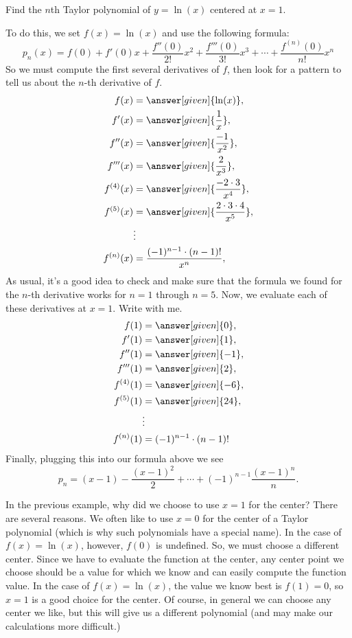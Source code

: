 \documentclass{ximera}
\begin{document}
\begin{example}
Find the $n$th Taylor polynomial of $y=\ln(x)$ centered at $x=1$.
\begin{explanation}
  To do this, we set $f(x) =\ln(x)$ and use the following formula:
    \[
    p_n(x) = f(0) + f'(0)x +\frac{f''(0)}{2!}x^2+\frac{f'''(0)}{3!}x^3+\cdots+\frac{f^{(n)}(0)}{n!}x^n
    \]
    So we must compute the first several derivatives of $f$, then look for a pattern 
    to tell us about the $n$-th derivative of $f$.
    \begin{align*}
      f(x) &= \answer[given]{\ln(x)},\\
      f'(x) &= \answer[given]{\frac{1}{x}},\\
      f''(x) &= \answer[given]{\frac{-1}{x^2}},\\
      f'''(x) &= \answer[given]{\frac{2}{x^3}},\\
      f^{(4)}(x) &= \answer[given]{\frac{-2\cdot 3}{x^4}},\\
      f^{(5)}(x) &= \answer[given]{\frac{2\cdot 3\cdot 4}{x^5}},\\
      &\vdots\\
      f^{(n)}(x) &= \frac{(-1)^{n-1}\cdot (n-1)!}{x^n},
    \end{align*}
    As usual, it's a good idea to check and make sure that the formula we found 
    for the $n$-th derivative works for $n=1$ through $n=5$.  Now, we evaluate 
    each of these derivatives at $x=1$. Write with me.
    \begin{align*}
      f(1) &= \answer[given]{0},\\
      f'(1) &= \answer[given]{1},\\
      f''(1) &= \answer[given]{-1},\\
      f'''(1) &= \answer[given]{2},\\
      f^{(4)}(1) &= \answer[given]{-6},\\
      f^{(5)}(1) &= \answer[given]{24},\\
      &\vdots\\
      f^{(n)}(1) &= (-1)^{n-1}\cdot (n-1)!
    \end{align*}
    Finally, plugging this into our formula above we see
    \[
    p_n = (x-1) -\frac{(x-1)^2}{2}+\cdots+(-1)^{n-1}\frac{(x-1)^n}{n}.
    \]
\end{explanation}
\end{example}

In the previous example, why did we choose to use $x=1$ for the center? 
There are several reasons.  We often like to use $x=0$ for the center of a 
Taylor polynomial (which is why such polynomials have a special name).  In 
the case of $f(x) = \ln(x)$, however, $f(0)$ is undefined.  So, we must choose 
a different center.  Since we have to evaluate the function at the center, any 
center point we choose should be a value for which we know and can easily 
compute the function value.  In the case of $f(x) = \ln(x)$, the value we know 
best is $f(1) = 0$, so $x=1$ is a good choice for the center.  Of course, in general we 
can choose any center we like, but this will give us a different polynomial (and 
may make our calculations more difficult.)
\end{document}
